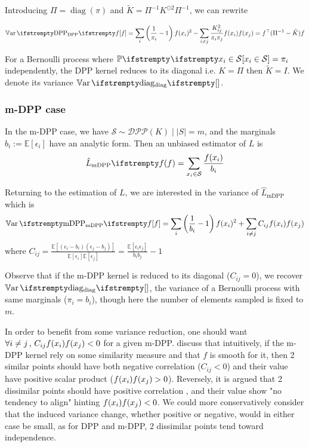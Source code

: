 Introducing $\Pi = \operatorname{diag}(\pi)$ and $\tilde K = \Pi^{-1}K^{\odot 2} \Pi^{-1}$, we can rewrite  

\begin{equation}
	\Var{\textrm{DPP}}{\query}=\sum_{i}\left(\frac{1}{\pi_{i}}-1\right) \query(x_{i})^{2}-\sum_{i \neq j} \frac{K_{ij}^{2}}{\pi_{i} \pi_{j}} \query(x_{i}) \query(x_{j}) =  \query\T (\Pi^{-1}  - \tilde{K}) \query 
\end{equation}

For a Bernoulli process where $\PP{}{x_i \in \mathcal S} = \pi_i$ independently, the DPP kernel reduces to its diagonal i.e. $K = \Pi$ then $\tilde K = I$. We denote its variance $\Var{\textrm{diag}}{}$.


\subsubsection{m-DPP case}

In the m-DPP case, we have $\mathcal S \sim \mathcal{DPP}(K) \mid |S|=m$, and the marginals $b_{i} := \mathbb{E}\left[\epsilon_{i}\right]$ have an analytic form. Then an unbiased estimator of $L$ is
\begin{equation*}
	\estloss{\textrm{mDPP}}{\query} = \sum_{x_i\in \mathcal S} \frac{\query(x_i)}{b_i}
\end{equation*}

Returning to the estimation of $L$, we are interested in the variance of $\hat L_{\textrm{mDPP}}$ which is
\begin{equation}
	\Var{\textrm{mDPP}}{\query}=\sum_{i}\left(\frac{1}{b_i}-1\right) \query(x_i)^2
	+ \sum_{i \neq j} C_{ij}\query(x_i) \query(x_j)
\end{equation}
where $C_{ij}=\frac{\mathbb{E}\left[\left(\epsilon_{i}-b_{i}\right)\left(\epsilon_{j}-b_{j}\right)\right]}{\mathbb{E}\left[\epsilon_{i}\right] \mathbb{E}\left[\epsilon_{j}\right]}=\frac{\mathbb{E}\left[\epsilon_{i} \epsilon_{j}\right]}{b_{i} b_{j}}-1
$

Observe that if the m-DPP kernel is reduced to its diagonal ($C_{ij} = 0$), we recover $\Var{\textrm{diag}}{}$, the variance of a Bernoulli process with same marginals ($\pi_i = b_i$), though here the number of elements sampled is fixed to $m$.

In order to benefit from some variance reduction, one should want $\forall i\neq j \,,\, C_{ij}f(x_i) f(x_j) <0$ for a given m-DPP.
\cite{zhang2017dppminibatch} discuss that intuitively, if the m-DPP kernel rely on some similarity measure and that $f$ is smooth for it, then 2 similar points should have both negative correlation ($C_{ij}<0$) and their value have positive scalar product ($f(x_i) f(x_j) > 0$). Reversely, it is argued that 2 dissimilar points should have positive correlation 
, and their value show "no tendency to align" hinting $f(x_i) f(x_j) < 0$. We could more conservatively consider that the induced variance change, whether positive or negative, would in either case be small, as for DPP and m-DPP, 2 dissimilar points tend toward independence.



